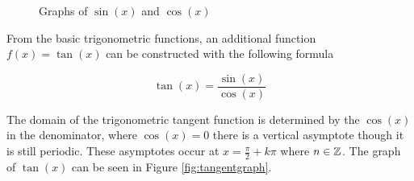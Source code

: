         \begin{figure}
            \centering
            \caption{Graphs of $\sin(x)$ and $\cos(x)$}
            \label{fig:triggraph}
        \end{figure}

        From the basic trigonometric functions, an additional function $f(x) = \tan(x)$ can be constructed with the following formula

        \begin{equation}
            \tan(x) = \frac{\sin(x)}{\cos(x)}
        \end{equation}

        The domain of the trigonometric tangent function is determined by the $\cos(x)$ in the denominator, where $\cos(x) = 0$ there is a vertical asymptote though it is still periodic. These asymptotes occur at $x = \frac{\pi}{2} + k\pi$ where $n \in \mathbb{Z}$. The graph of $\tan(x)$ can be seen in Figure \ref{fig:tangentgraph}.

